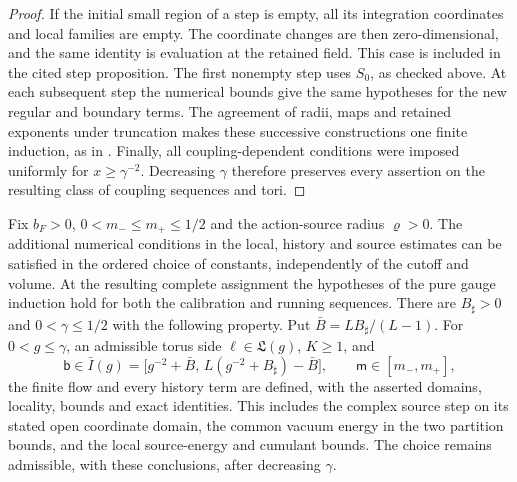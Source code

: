 \documentclass[11pt,letterpaper,reqno]{amsart}
\makeatletter
\theoremstyle{definition}
\newcommand{\ms@minorstart}{%
  \pushQED{\qed}\renewcommand{\qedsymbol}{$\blacksquare$}}
\newenvironment{proposition}[1][]{\ms@minorstart\ms@proposition[#1]}
  {\popQED\endms@proposition}
\theoremstyle{remark}
\makeatother
\begin{document}
\begin{proof}
If the initial small region of a step is empty, all its
integration coordinates and local families are empty.
The coordinate changes are then zero-dimensional, and
the same identity is evaluation at the retained field.
This case is included in the cited step proposition.
The first nonempty step uses $S_0$, as checked above.
At each subsequent step the numerical bounds give the
same hypotheses for the new regular and boundary terms.
The agreement of radii, maps and retained exponents under
truncation makes these successive constructions one
finite induction, as in \cite[Prop.~4.166]{YMM1}.
Finally, all coupling-dependent conditions were imposed
uniformly for $x\ge\gamma^{-2}$. Decreasing $\gamma$
therefore preserves every assertion on the resulting
class of coupling sequences and tori.
\end{proof}

\begin{proposition}[A common choice and the finite induction]
\label{C-396-12}\label{prop:qcd-joint-admission}
Fix $b_F>0$, $0<m_-\le m_+\le1/2$ and the action-source
radius $\varrho>0$. The additional numerical conditions in the
local, history and source estimates can be satisfied in the
ordered choice of constants, independently of the cutoff and
volume. At the resulting complete assignment the hypotheses
of the pure gauge induction hold for both the calibration
and running sequences. There are $B_\sharp>0$ and
$0<\gamma\le1/2$ with the following property. Put
$\bar B=LB_\sharp/(L-1)$. For $0<g\le\gamma$, an admissible
torus side $\ell\in\mathfrak L(g)$, $K\ge1$, and
\[
 \mathsf b\in\bar I(g)
 =\bigl[g^{-2}+\bar B,\,L(g^{-2}+B_\sharp)-\bar B\bigr],
 \qquad \mathsf m\in[m_-,m_+],
\]
the finite flow and every history term are defined, with
the asserted domains, locality, bounds and exact identities.
This includes the complex source step on its stated open
coordinate domain, the common vacuum energy in the two
partition bounds, and the local source-energy and cumulant
bounds. The choice remains admissible, with these conclusions,
after decreasing $\gamma$.
\end{proposition}
\end{document}
